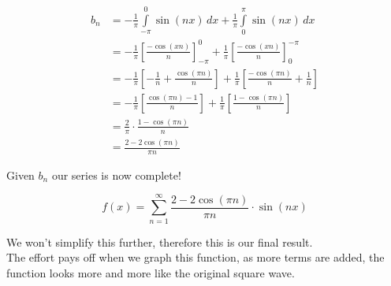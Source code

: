 \documentclass{article}
\newcommand{\integral}[4]{\int\limits_{#1}^{#2} #3\,d#4}
\begin{document}
\begin{align*}
    b_n &=
    -\frac{1}{\pi} \integral{-\pi}{0}{\sin(nx)}{x} +
    \frac{1}{\pi} \integral{0}{\pi}{\sin(nx)}{x} \\
    &= -\frac{1}{\pi} {\left[\frac{-\cos(xn)}{n}\right]}_{-\pi}^{0} +
    \frac{1}{\pi} {\left[\frac{-\cos(xn)}{n}\right]}_{0}^{-\pi} \\
    &= -\frac{1}{\pi} \left[-\frac{1}{n}+\frac{\cos(\pi n)}{n}\right] +
    \frac{1}{\pi} \left[\frac{-\cos(\pi n)}{n}+\frac{1}{n}\right] \\
    &= -\frac{1}{\pi} \left[\frac{\cos(\pi n)-1}{n}\right] +
    \frac{1}{\pi} \left[\frac{1-\cos(\pi n)}{n}\right] \\
    &= \frac{2}{\pi} \cdot \frac{1-\cos(\pi n)}{n} \\
    &= \frac{2-2\cos(\pi n)}{\pi n}
\end{align*}

Given \(b_n\) our series is now complete!

\[
    f(x)=\sum_{n=1}^{\infty} \frac{2-2\cos(\pi n)}{\pi n} \cdot \sin(nx)
\]

We won't simplify this further, therefore this is our final result. \\
The effort pays off when we graph this function, as more terms are added, the function looks more and more like the original square wave.
\end{document}

